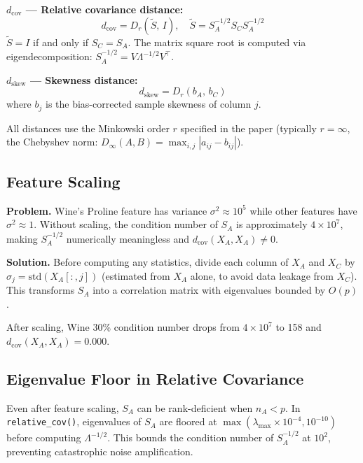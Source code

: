\textbf{$d_{\text{cov}}$ --- Relative covariance distance:}
\begin{equation}
    d_{\text{cov}} = D_r\!\left(\tilde{S},\, I\right), \quad \tilde{S} = S_A^{-1/2} S_C S_A^{-1/2}
\end{equation}
$\tilde{S} = I$ if and only if $S_C = S_A$. The matrix square root is computed via eigendecomposition: $S_A^{-1/2} = V \Lambda^{-1/2} V^\top$.

\textbf{$d_{\text{skew}}$ --- Skewness distance:}
\begin{equation}
    d_{\text{skew}} = D_r\!\left(b_A,\, b_C\right)
\end{equation}
where $b_j$ is the bias-corrected sample skewness of column $j$.

All distances use the Minkowski order $r$ specified in the paper (typically $r = \infty$, the Chebyshev norm: $D_\infty(A, B) = \max_{i,j} |a_{ij} - b_{ij}|$).

\subsection{Feature Scaling}
\label{sec:scaling}

\textbf{Problem.} Wine's Proline feature has variance $\sigma^2 \approx 10^5$ while other features have $\sigma^2 \approx 1$. Without scaling, the condition number of $S_A$ is approximately $4 \times 10^7$, making $S_A^{-1/2}$ numerically meaningless and $d_{\text{cov}}(X_A, X_A) \neq 0$.

\textbf{Solution.} Before computing any statistics, divide each column of $X_A$ and $X_C$ by $\hat{\sigma}_j = \text{std}(X_A[:,j])$ (estimated from $X_A$ alone, to avoid data leakage from $X_C$). This transforms $S_A$ into a correlation matrix with eigenvalues bounded by $O(p)$.

After scaling, Wine 30\% condition number drops from $4 \times 10^7$ to 158 and $d_{\text{cov}}(X_A, X_A) = 0.000$.

\subsection{Eigenvalue Floor in Relative Covariance}

Even after feature scaling, $S_A$ can be rank-deficient when $n_A < p$. In \texttt{relative\_cov()}, eigenvalues of $S_A$ are floored at $\max(\lambda_{\max} \times 10^{-4}, 10^{-10})$ before computing $\Lambda^{-1/2}$. This bounds the condition number of $S_A^{-1/2}$ at $10^2$, preventing catastrophic noise amplification.

